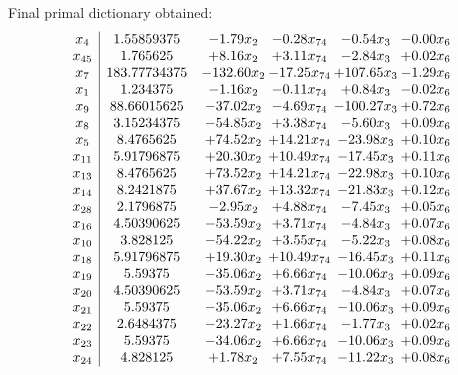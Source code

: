 \documentclass[8pt]{article}
\begin{document}
 Final primal dictionary obtained: 
\[\begin{array}{c| c c@{\hskip 2pt} c@{\hskip 2pt} c@{\hskip 2pt} c@{\hskip 2pt} }
 x_{4}   &  1.55859375 & -1.79 x_{2} & -0.28 x_{74} & -0.54 x_{3} & -0.00 x_{6}\\
 x_{45}   &  1.765625 & +  8.16 x_{2} & +  3.11 x_{74} & -2.84 x_{3} & +  0.02 x_{6}\\
 x_{7}   &  183.77734375 & -132.60 x_{2} & -17.25 x_{74} & + 107.65 x_{3} & -1.29 x_{6}\\
 x_{1}   &  1.234375 & -1.16 x_{2} & -0.11 x_{74} & +  0.84 x_{3} & -0.02 x_{6}\\
 x_{9}   &  88.66015625 & -37.02 x_{2} & -4.69 x_{74} & -100.27 x_{3} & +  0.72 x_{6}\\
 x_{8}   &  3.15234375 & -54.85 x_{2} & +  3.38 x_{74} & -5.60 x_{3} & +  0.09 x_{6}\\
 x_{5}   &  8.4765625 & + 74.52 x_{2} & + 14.21 x_{74} & -23.98 x_{3} & +  0.10 x_{6}\\
 x_{11}   &  5.91796875 & + 20.30 x_{2} & + 10.49 x_{74} & -17.45 x_{3} & +  0.11 x_{6}\\
 x_{13}   &  8.4765625 & + 73.52 x_{2} & + 14.21 x_{74} & -22.98 x_{3} & +  0.10 x_{6}\\
 x_{14}   &  8.2421875 & + 37.67 x_{2} & + 13.32 x_{74} & -21.83 x_{3} & +  0.12 x_{6}\\
 x_{28}   &  2.1796875 & -2.95 x_{2} & +  4.88 x_{74} & -7.45 x_{3} & +  0.05 x_{6}\\
 x_{16}   &  4.50390625 & -53.59 x_{2} & +  3.71 x_{74} & -4.84 x_{3} & +  0.07 x_{6}\\
 x_{10}   &  3.828125 & -54.22 x_{2} & +  3.55 x_{74} & -5.22 x_{3} & +  0.08 x_{6}\\
 x_{18}   &  5.91796875 & + 19.30 x_{2} & + 10.49 x_{74} & -16.45 x_{3} & +  0.11 x_{6}\\
 x_{19}   &  5.59375 & -35.06 x_{2} & +  6.66 x_{74} & -10.06 x_{3} & +  0.09 x_{6}\\
 x_{20}   &  4.50390625 & -53.59 x_{2} & +  3.71 x_{74} & -4.84 x_{3} & +  0.07 x_{6}\\
 x_{21}   &  5.59375 & -35.06 x_{2} & +  6.66 x_{74} & -10.06 x_{3} & +  0.09 x_{6}\\
 x_{22}   &  2.6484375 & -23.27 x_{2} & +  1.66 x_{74} & -1.77 x_{3} & +  0.02 x_{6}\\
 x_{23}   &  5.59375 & -34.06 x_{2} & +  6.66 x_{74} & -10.06 x_{3} & +  0.09 x_{6}\\
 x_{24}   &  4.828125 & +  1.78 x_{2} & +  7.55 x_{74} & -11.22 x_{3} & +  0.08 x_{6}\\

\end{array}\]
\end{document}
